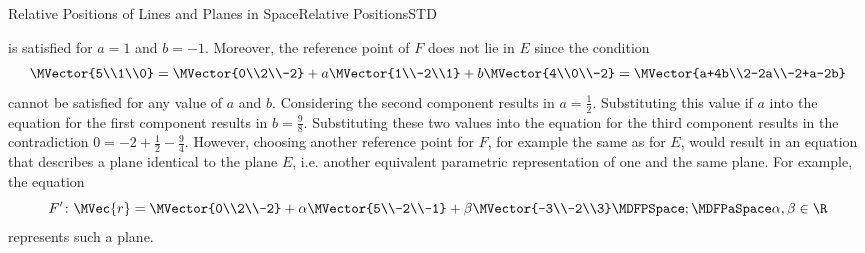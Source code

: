 \begin{MXContent}{Relative Positions of Lines and Planes in Space}{Relative Positions}{STD}
\begin{MExample}
\begin{itemize}
\[ \]
  is satisfied for $a=1$ and $b=-1$. Moreover, the reference point of $F$ does not lie in $E$ since the condition 
 \[
  \MVector{5\\1\\0}=\MVector{0\\2\\-2}+a\MVector{1\\-2\\1}+b\MVector{4\\0\\-2}=\MVector{a+4b\\2-2a\\-2+a-2b}
 \]
  cannot be satisfied for any value of $a$ and $b$. Considering the second component results in $a=\frac{1}{2}$. 
  Substituting this value if $a$ into the equation for the first component results in $b=\frac{9}{8}$. 
  Substituting these two values into the equation for the third component results in the contradiction
  $0=-2+\frac{1}{2}-\frac{9}{4}$. However, choosing another reference point for $F$, for example the same 
  as for $E$, would result in an equation that describes a plane identical to the plane $E$, i.e. 
  another equivalent parametric representation of one and the same plane. For example, the equation
 \[
  F^{\prime}\colon\MVec{r}=\MVector{0\\2\\-2}+\alpha\MVector{5\\-2\\-1}+\beta\MVector{-3\\-2\\3}\MDFPSpace;\MDFPaSpace \alpha,\beta\in\R
 \]
  represents such a plane.
 

\end{itemize}
\end{MExample}
\end{MXContent}
